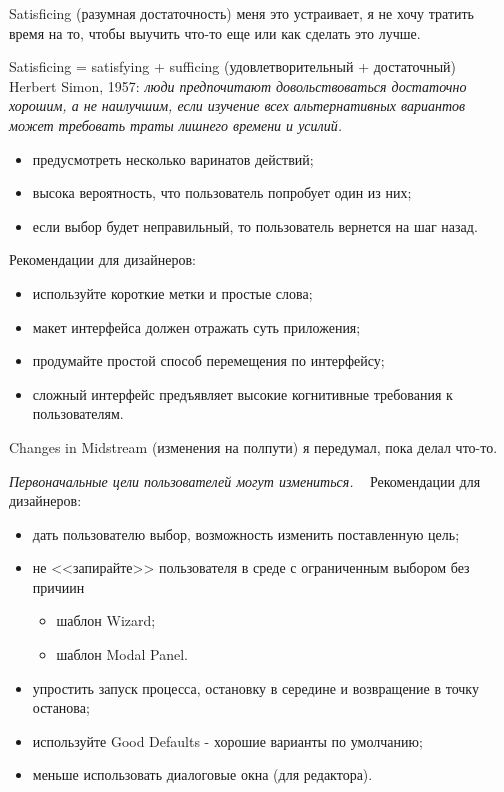 \documentclass{beamer}
\begin{document}
\begin{frame}[t]	
	\begin{block}{Satisficing (разумная достаточность)}
		 меня это устраивает, я не хочу тратить время на то, чтобы выучить что-то еще или как сделать это лучше.
	\end{block}	
	Satisficing = satisfying + sufficing (удовлетворительный + достаточный)
	~
	Herbert Simon, 1957: \textit{люди предпочитают довольствоваться достаточно хорошим, а не наилучшим, если изучение всех альтернативных вариантов может требовать траты лишнего времени и усилий.}
	\begin{itemize}
		\item предусмотреть несколько варинатов действий;
		\item высока вероятность, что пользователь попробует один из них;
		\item если выбор будет неправильный, то пользователь вернется на шаг назад.		
	\end{itemize}
	Рекомендации для дизайнеров:
	\begin{itemize}
		\item используйте короткие метки и простые слова;
		\item макет интерфейса должен отражать суть приложения;
		\item продумайте простой способ перемещения	по интерфейсу;
		\item сложный интерфейс предъявляет высокие когнитивные требования к пользователям.
	\end{itemize}	
\end{frame}

\begin{frame}[t]	
	\begin{block}{Changes in Midstream (изменения на полпути)}
		 я передумал, пока делал что-то.
	\end{block}	
	\textit{Первоначальные цели пользователей могут измениться.}
	~
	Рекомендации для дизайнеров:
	\begin{itemize}
		\item дать пользователю выбор, возможность изменить поставленную цель;
		\item не <<запирайте>> пользователя в среде с ограниченным выбором без причиин
		\begin{itemize}
			\item шаблон Wizard;
			\item шаблон Modal Panel.			
		\end{itemize}
		\item упростить запуск процесса, остановку в середине и возвращение в точку останова;
		\item используйте Good Defaults - хорошие варианты по умолчанию;		
		\item меньше использовать диалоговые окна (для редактора).		
	\end{itemize}	
\end{frame}
\end{document}
